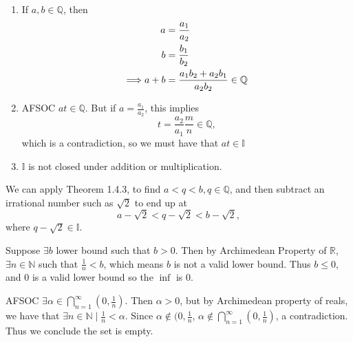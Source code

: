 \begin{exercise}
\begin{enumerate}[label=(\alph*)]
	\item If $a, b \in \mathbb{Q}$, then 
	\begin{align*}
		a &= \frac{a_1}{a_2} \\
		b &= \frac{b_1}{b_2} \\
		\Longrightarrow a + b &= \frac{a_1b_2 + a_2b_1}{a_2b_2} \in \mathbb{Q}
	\end{align*}
	\item AFSOC $at \in \mathbb{Q}$. But if $a = \frac{a_1}{a_2}$, this implies
	\begin{equation*}
		t = \frac{a_2}{a_1}\frac{m}{n} \in \mathbb{Q},
	\end{equation*}
	which is a contradiction, so we must have that $at \in\mathbb{I}$
	\item $\mathbb{I}$ is not closed under addition or multiplication.
\end{enumerate}
\end{exercise}

\begin{exercise}
	We can apply Theorem 1.4.3, to find $a < q < b, q \in \mathbb{Q}$, and then subtract an irrational number such as $\sqrt{2}$ to end up at 
	\begin{equation}
		a - \sqrt{2} < q - \sqrt{2} < b - \sqrt{2},
	\end{equation}
	where $q- \sqrt{2} \in \mathbb{I}$.
\end{exercise}

\begin{exercise}
	Suppose $\exists b$ lower bound such that $b > 0$. Then by Archimedean Property of $\mathbb{R}$, $\exists n \in \mathbb{N}$ such that $\frac{1}{n} < b$, which means $b$ is not a valid lower bound. Thus $b \leq 0$, and 0 is a valid lower bound so the $\inf$ is 0.
\end{exercise}

\begin{exercise}
AFSOC $\exists \alpha \in \bigcap_{n=1}^\infty (0, \frac{1}{n})$. Then $\alpha >0$, but by Archimedean property of reals, we have that $\exists n \in \mathbb{N} \mid \frac{1}{n} < \alpha$. Since $\alpha \not\in (0, \frac{1}{n}$, $\alpha \not\in \bigcap_{n=1}^\infty (0, \frac{1}{n})$, a contradiction. Thus we conclude the set is empty.
\end{exercise}

